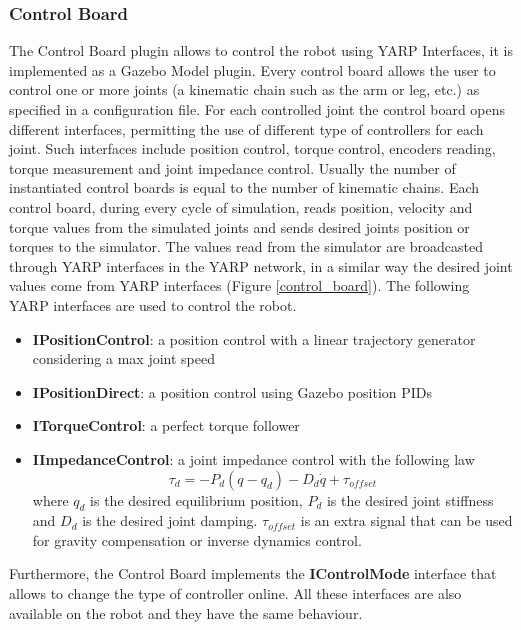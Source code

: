 \subsubsection{Control Board}
The Control Board plugin allows to control the robot using YARP Interfaces, it is implemented as a Gazebo Model plugin. Every control board allows the user to control one or more joints (a kinematic chain such as the arm or leg, etc.) as specified in a configuration file. For each controlled joint the control board opens different interfaces, permitting the use of different type of controllers for each joint. Such interfaces include position control, torque control, encoders reading, torque measurement and joint impedance control. Usually the number of instantiated control boards is equal to the number of kinematic chains. Each control board, during every cycle of simulation, reads position, velocity and torque values from the simulated joints and sends desired joints position or torques to the simulator. The values read from the simulator are broadcasted through YARP interfaces in the YARP network, in a similar way the desired joint values come from YARP interfaces (Figure \ref{control_board}). The following YARP interfaces are used to control the robot.
\begin{itemize}
\item \textbf{IPositionControl}: a position control with a linear trajectory generator considering a max joint speed
\item \textbf{IPositionDirect}: a position control using Gazebo position PIDs
\item \textbf{ITorqueControl}: a perfect torque follower
\item \textbf{IImpedanceControl}: a joint impedance control with the following law
\begin{equation}
    \tau_d = -P_d(q-q_d) - D_d\dot{q} + \tau_{offset}
\end{equation}
where $q_d$ is the desired equilibrium position, $P_d$ is the desired joint stiffness and $D_d$ is the desired joint damping. $\tau_{offset}$ is an extra signal that can be used for gravity compensation or inverse dynamics control.
\end{itemize}
Furthermore, the Control Board implements the \textbf{IControlMode} interface that allows to change the type of controller online. All these interfaces are also available on the robot and they have the same behaviour.

